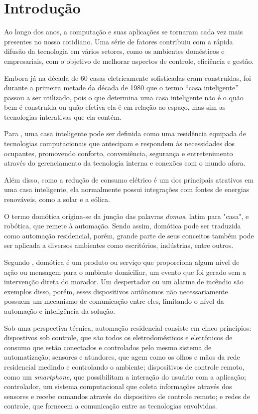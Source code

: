 \chapter{Introdução}

\label{cap:introducao}

Ao longo dos anos, a computação e suas aplicações se tornaram cada vez mais presentes no nosso cotidiano. Uma
série de fatores contribuiu com a rápida difusão da tecnologia em vários setores, como os ambientes domésticos
e empresariais, com o objetivo de melhorar aspectos de controle, eficiência e gestão.

Embora já na década de 60 casas eletricamente sofisticadas eram construídas, foi durante a primeira metade da
década de 1980 que o termo  ``casa inteligente'' passou a ser utilizado, pois o que determina uma casa
inteligente não é o quão bem é construída ou quão efetiva ela é em relação ao espaço, mas sim as tecnologias
interativas que ela contém. \cite{harper2003}

Para , uma casa inteligente pode ser definida como uma residência equipada de
tecnologias computacionais que antecipam e respondem às necessidades dos ocupantes, promovendo conforto,
conveniência, segurança e entretenimento através do gerenciamento da tecnologia interna e conexões com o mundo
afora.

Além disso, como a redução de consumo elétrico é um dos principais atrativos em uma casa inteligente, ela
normalmente possui integrações com fontes de energias renováveis, como a solar e a eólica.

O termo domótica origina-se da junção das palavras \textit{domus}, latim para "casa", e robótica, que remete à
automação. Sendo assim, domótica pode ser traduzida como automação residencial, porém, grande parte de seus
conceitos também pode ser aplicada a diversos ambientes como escritórios, indústrias, entre outros.

Segundo , domótica é um produto ou serviço que proporciona algum nível de ação ou
mensagem para o ambiente domiciliar, um evento que foi gerado sem a intervenção direta do morador. Um
despertador ou um alarme de incêndio são exemplos disso, porém, esses dispositivos autônomos não
necessariamente possuem um mecanismo de comunicação entre eles, limitando o nível da automação e inteligência
da solução.

Sob uma perspectiva técnica, automação residencial consiste em cinco princípios: dispostivos sob controle, que
são todos os eletrodomésticos e eletrônicos de consumo que estão conectados e controlados pelo mesmo sistema
de automatização; sensores e atuadores, que agem como os olhos e mãos da rede residencial medindo e
controlando o ambiente; dispositivos de controle remoto, como um \textit{smartphone}, que possibilitam a
interação do usuário com a aplicação; controlador, um sistema computacional que coleta informações através dos
sensores e recebe comandos através do dispositivo de controle remoto; e redes de controle, que fornecem a
comunicação entre as tecnologias envolvidas. \cite{kyas2013}

